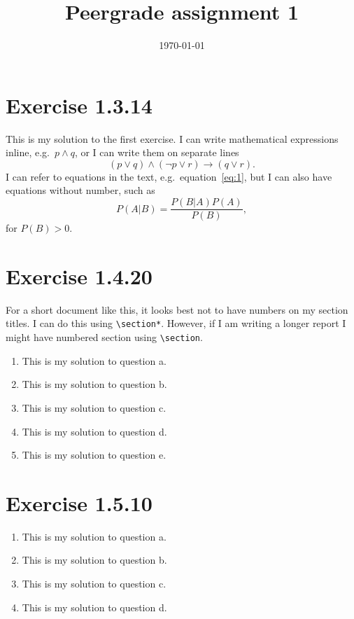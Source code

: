\documentclass[a4paper,11pt]{article}
\title{Peergrade assignment 1}
\author{} %
\date{\today}
\begin{document}
 

\maketitle

\section*{Exercise 1.3.14}

This is my solution to the first exercise. I can write mathematical expressions inline, e.g.~$p \land q$, or I can write them on separate lines
\begin{equation}
  \label{eq:1}
  (p \lor q) \land (\lnot p \lor r) \rightarrow (q \lor r) .
\end{equation}
I can refer to equations in the text, e.g.~equation~\eqref{eq:1}, but I can also have equations without number, such as
\begin{equation*}
  P(A | B) = \frac{P(B | A) P(A)}{P(B)} ,
\end{equation*}
for $P(B) > 0$.
\section*{Exercise 1.4.20}
For a short document like this, it looks best not to have numbers on my section titles. I can do this using \verb+\section*+. However, if I am writing a longer report I might have numbered section using \verb+\section+.

\begin{enumerate}
\item This is my solution to question a.
\item This is my solution to question b.
\item This is my solution to question c.
\item This is my solution to question d.
\item This is my solution to question e.
\end{enumerate}

\section*{Exercise 1.5.10}

\begin{enumerate}
\item This is my solution to question a.
\item This is my solution to question b.
\item This is my solution to question c.
\item This is my solution to question d.
\end{enumerate}
\end{document}
